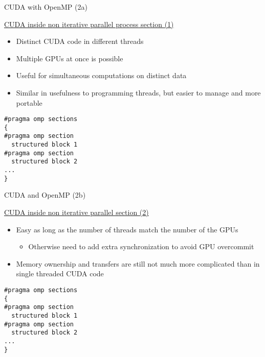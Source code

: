 \documentclass{beamer}
\begin{document}
\begin{frame}[containsverbatim]{CUDA with OpenMP (2a)}

\underline{CUDA inside non iterative parallel process section (1)}

{\color{orange}
  \begin{itemize}
  \item Distinct CUDA code in different threads
  \item Multiple GPUs at once is possible
  \item Useful for simultaneous computations on distinct data
  \item Similar in usefulness to programming threads, but easier
    to manage and more portable
  \end{itemize}
}

\begin{lstlisting}
#pragma omp sections
{
#pragma omp section
  structured block 1
#pragma omp section
  structured block 2
...
}
\end{lstlisting}
\end{frame}

\begin{frame}[containsverbatim]{CUDA and OpenMP (2b)}

\underline{CUDA inside non iterative parallel section (2)}

\begin{itemize}
  \item Easy as long as the number of threads match the number of the GPUs
    \begin{itemize}
    \item Otherwise need to add extra synchronization to avoid GPU overcommit
    \end{itemize}
  \item Memory ownership and transfers are still not much more complicated
    than in single threaded CUDA code
\end{itemize}

\begin{lstlisting}
#pragma omp sections
{
#pragma omp section
  structured block 1
#pragma omp section
  structured block 2
...
}
\end{lstlisting}
\end{frame}
\end{document}
